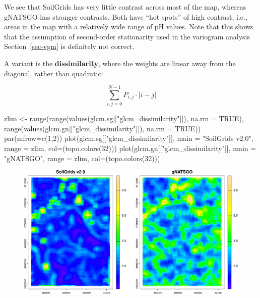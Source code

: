 \documentclass[
  letterpaper,
  DIV=11,
  numbers=noendperiod]{scrartcl}
\newenvironment{Shaded}{\begin{snugshade}}{\end{snugshade}}
\newcommand{\AttributeTok}[1]{\textcolor[rgb]{0.40,0.45,0.13}{#1}}
\newcommand{\ConstantTok}[1]{\textcolor[rgb]{0.56,0.35,0.01}{#1}}
\newcommand{\DecValTok}[1]{\textcolor[rgb]{0.68,0.00,0.00}{#1}}
\newcommand{\FunctionTok}[1]{\textcolor[rgb]{0.28,0.35,0.67}{#1}}
\newcommand{\NormalTok}[1]{\textcolor[rgb]{0.00,0.23,0.31}{#1}}
\newcommand{\OtherTok}[1]{\textcolor[rgb]{0.00,0.23,0.31}{#1}}
\newcommand{\StringTok}[1]{\textcolor[rgb]{0.13,0.47,0.30}{#1}}
\begin{document}
We see that SoilGrids has very little contrast across most of the map,
whereas gNATSGO has stronger contrasts. Both have ``hot spots'' of high
contrast, i.e., areas in the map with a relatively wide range of pH
values. Note that this shows that the assumption of second-order
stationarity used in the variogram analysis Section~\ref{sec-vgm} is
definitely not correct.

A variant is the \textbf{dissimilarity}, where the weights are linear
away from the diagonal, rather than quadratic:

\[\sum_{i,j = 0}^{N-1} P_{i,j}\cdot |i - j|\]

\begin{Shaded}
\begin{Highlighting}[]
\NormalTok{zlim }\OtherTok{\textless{}{-}} \FunctionTok{range}\NormalTok{(}\FunctionTok{range}\NormalTok{(}\FunctionTok{values}\NormalTok{(glcm.sg[[}\StringTok{"glcm\_dissimilarity"}\NormalTok{]]), }\AttributeTok{na.rm =} \ConstantTok{TRUE}\NormalTok{), }
                     \FunctionTok{range}\NormalTok{(}\FunctionTok{values}\NormalTok{(glcm.gn[[}\StringTok{"glcm\_dissimilarity"}\NormalTok{]]), }\AttributeTok{na.rm =} \ConstantTok{TRUE}\NormalTok{))}
\FunctionTok{par}\NormalTok{(}\AttributeTok{mfrow=}\FunctionTok{c}\NormalTok{(}\DecValTok{1}\NormalTok{,}\DecValTok{2}\NormalTok{))}
\FunctionTok{plot}\NormalTok{(glcm.sg[[}\StringTok{"glcm\_dissimilarity"}\NormalTok{]], }\AttributeTok{main =} \StringTok{"SoilGrids v2.0"}\NormalTok{, }
     \AttributeTok{range =}\NormalTok{ zlim, }\AttributeTok{col=}\NormalTok{(}\FunctionTok{topo.colors}\NormalTok{(}\DecValTok{32}\NormalTok{)))}
\FunctionTok{plot}\NormalTok{(glcm.gn[[}\StringTok{"glcm\_dissimilarity"}\NormalTok{]], }\AttributeTok{main =} \StringTok{"gNATSGO"}\NormalTok{, }
     \AttributeTok{range =}\NormalTok{ zlim, }\AttributeTok{col=}\NormalTok{(}\FunctionTok{topo.colors}\NormalTok{(}\DecValTok{32}\NormalTok{)))}
\end{Highlighting}
\end{Shaded}

\begin{figure}[H]

{\centering \includegraphics{PatternAnalysisWorkshopTutorial_files/figure-pdf/unnamed-chunk-24-1.pdf}

}

\end{figure}
\end{document}
